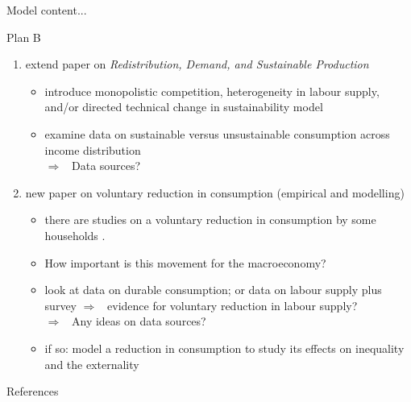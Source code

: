 \documentclass[11pt,aspectratio=169]{beamer}
\newcommand{\ar}{$\Rightarrow$ \ }
\begin{document}
\begin{frame}{Model}
	content...
\end{frame}

\begin{frame}{Plan B}
\begin{enumerate}
	\item extend paper on \textit{Redistribution, Demand, and Sustainable Production}
	\begin{itemize}
\item introduce monopolistic competition, heterogeneity in labour supply, and/or directed technical change in sustainability model
\item examine data on sustainable versus unsustainable consumption across income distribution  \\
\alert{\ar Data sources?}
	\end{itemize}
\item new paper on voluntary reduction in consumption (empirical and modelling)
\begin{itemize}
	\item there are studies on a voluntary reduction in consumption by some households \citep{Alexander2012TheContext}. 
	\item How important is this movement for the macroeconomy?
\item look at data on durable consumption; or data on labour supply plus survey \ar evidence for voluntary reduction in labour supply?\\
\alert{\ar Any ideas on data sources?}
\item if so: model a reduction in consumption to study its effects on inequality and the externality
\end{itemize}
\end{enumerate}
\end{frame}
\begin{frame}[allowframebreaks]{References}
	
	
	
\end{frame}
\end{document}
